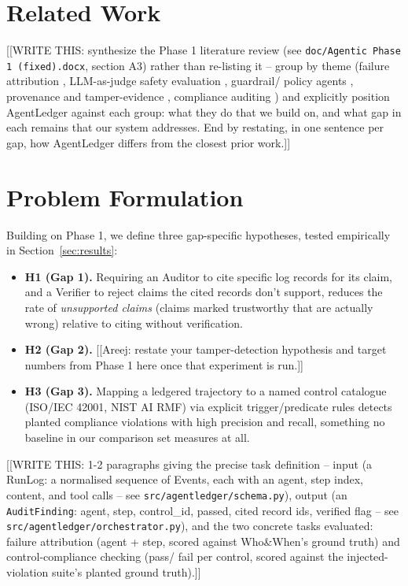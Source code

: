 \documentclass[conference]{IEEEtran}
\begin{document}
\section{Related Work}
[[WRITE THIS: synthesize the Phase 1 literature review (see
\texttt{doc/Agentic Phase 1 (fixed).docx}, section A3) rather than
re-listing it -- group by theme (failure attribution
\cite{zhang2025whowhen,cemri2025mast,zhang2026agentracer}, LLM-as-judge
safety evaluation \cite{luo2025agentauditor,zheng2023llmjudge}, guardrail/
policy agents \cite{chen2025shieldagent,wang2026agentspec,xiang2025guardagent},
provenance and tamper-evidence \cite{souza2025provagent,li2026auditablellm},
compliance auditing \cite{zheng2026audagent,ameur2025eurocomply,macbench2026})
and explicitly position AgentLedger against each group: what they do that we
build on, and what gap in each remains that our system addresses. End by
restating, in one sentence per gap, how AgentLedger differs from the closest
prior work.]]

\section{Problem Formulation}
Building on Phase 1, we define three gap-specific hypotheses, tested
empirically in Section~\ref{sec:results}:

\begin{itemize}
  \item \textbf{H1 (Gap 1).} Requiring an Auditor to cite specific log
  records for its claim, and a Verifier to reject claims the cited records
  don't support, reduces the rate of \emph{unsupported claims} (claims
  marked trustworthy that are actually wrong) relative to citing without
  verification.
  \item \textbf{H2 (Gap 2).} [[Areej: restate your tamper-detection
  hypothesis and target numbers from Phase 1 here once that experiment is
  run.]]
  \item \textbf{H3 (Gap 3).} Mapping a ledgered trajectory to a named
  control catalogue (ISO/IEC 42001, NIST AI RMF) via explicit
  trigger/predicate rules detects planted compliance violations with high
  precision and recall, something no baseline in our comparison set
  measures at all.
\end{itemize}

[[WRITE THIS: 1-2 paragraphs giving the precise task definition -- input
(a RunLog: a normalised sequence of Events, each with an agent, step index,
content, and tool calls -- see \texttt{src/agentledger/schema.py}), output
(an \texttt{AuditFinding}: agent, step, control\_id, passed, cited record
ids, verified flag -- see \texttt{src/agentledger/orchestrator.py}), and the
two concrete tasks evaluated: failure attribution (agent + step, scored
against Who\&When's ground truth) and control-compliance checking (pass/
fail per control, scored against the injected-violation suite's planted
ground truth).]]
\end{document}

